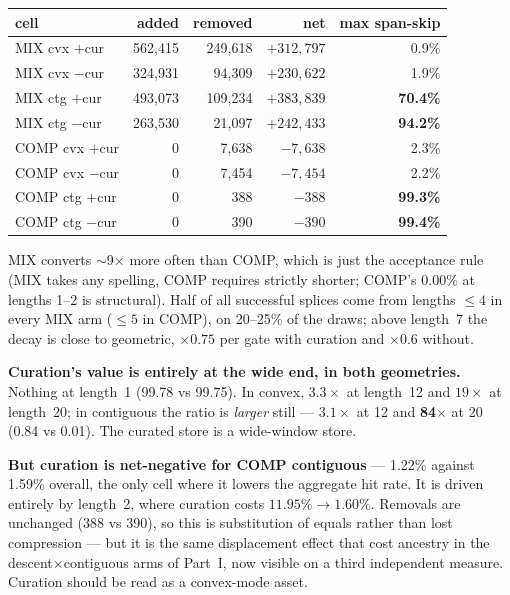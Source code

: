\documentclass[11pt]{article}
\begin{document}
\begin{table}[h]\centering\small
\begin{tabular}{lrrrr}
\toprule
cell & added & removed & net & max span-skip \\
\midrule
MIX cvx $+$cur & 562{,}415 & 249{,}618 & $+312{,}797$ & 0.9\% \\
MIX cvx $-$cur & 324{,}931 & 94{,}309 & $+230{,}622$ & 1.9\% \\
MIX ctg $+$cur & 493{,}073 & 109{,}234 & $+383{,}839$ & \textbf{70.4\%} \\
MIX ctg $-$cur & 263{,}530 & 21{,}097 & $+242{,}433$ & \textbf{94.2\%} \\
COMP cvx $+$cur & 0 & 7{,}638 & $-7{,}638$ & 2.3\% \\
COMP cvx $-$cur & 0 & 7{,}454 & $-7{,}454$ & 2.2\% \\
COMP ctg $+$cur & 0 & 388 & $-388$ & \textbf{99.3\%} \\
COMP ctg $-$cur & 0 & 390 & $-390$ & \textbf{99.4\%} \\
\bottomrule
\end{tabular}
\end{table}

MIX converts $\sim$9$\times$ more often than COMP, which is just the acceptance
rule (MIX takes any spelling, COMP requires strictly shorter; COMP's 0.00\% at
lengths 1--2 is structural). Half of all successful splices come from lengths
$\le4$ in every MIX arm ($\le5$ in COMP), on 20--25\% of the draws; above
length~7 the decay is close to geometric, $\times0.75$ per gate with curation
and $\times0.6$ without.

\textbf{Curation's value is entirely at the wide end, in both geometries.}
Nothing at length~1 (99.78 vs 99.75). In convex, $3.3\times$ at length~12 and
$19\times$ at length~20; in contiguous the ratio is \emph{larger} still ---
$3.1\times$ at 12 and \textbf{84$\times$} at 20 (0.84 vs 0.01). The curated
store is a wide-window store.

\textbf{But curation is net-negative for COMP contiguous} --- 1.22\% against
1.59\% overall, the only cell where it lowers the aggregate hit rate. It is
driven entirely by length~2, where curation costs $11.95\% \rightarrow 1.60\%$.
Removals are unchanged (388 vs 390), so this is substitution of equals rather
than lost compression --- but it is the same displacement effect that cost
ancestry in the descent$\times$contiguous arms of Part~I, now visible on a
third independent measure. Curation should be read as a convex-mode asset.
\end{document}

